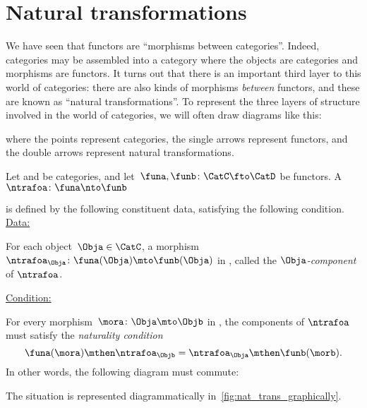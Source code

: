 

\section{Natural transformations}

We have seen that functors are ``morphisms between categories''. Indeed, categories may be assembled into a category \index{\Category} where the objects are categories and morphisms are functors. It turns out that there is an important third layer to this world of categories: there are also kinds of morphisms \emph{between} functors, and these are known as ``natural transformations''. To represent the three layers of structure involved in the world of categories, we will often draw diagrams like this:
\begin{center}
\end{center}

where the points represent categories, the single arrows represent functors, and the double arrows represent natural transformations.


\begin{ctdefinition}
  \label{def:natural-transformation}
  Let \CatC and \CatD be categories, and let~$\funa,\funb\colon \CatC\fto \CatD$ be functors. A \emph{}~$\ntrafoa \colon \funa\nto \funb$
  \begin{center}
  \end{center}
  is defined by the following constituent data, satisfying the following condition.\\
  \underline{Data:}
  \begin{compactenum}
    \item For each object~$\Obja\in \CatC$, a morphism $\ntrafoa_\Obja \colon \funa(\Obja)\mto \funb(\Obja)$ in \CatD, called the $\Obja$\emph{-component} of $\ntrafoa$.
  \end{compactenum}
  \underline{Condition:}
  \begin{compactenum}
    \item For every morphism~$\mora\colon \Obja\mto \Objb$ in \CatC, the components of $\ntrafoa$ must satisfy the \emph{naturality condition}
    \begin{equation}
      \funa(\mora)\mthen \ntrafoa_\Objb = \ntrafoa_\Obja\mthen \funb(\morb).
    \end{equation}
    In other words, the following diagram must commute:
    \begin{center}
    \end{center}
  \end{compactenum}
  The situation is represented diagrammatically in~\cref{fig:nat_trans_graphically}.
\end{ctdefinition}

